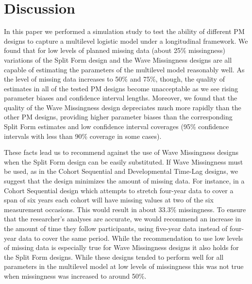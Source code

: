 \documentclass{svjour3}                     %
\begin{document}
\section{Discussion}
\label{4}
In this paper we performed a simulation study to test the ability of different PM designs to capture a multilevel logistic model under a longitudinal framework. We found that for low levels of planned missing data (about 25\% missingness) variations of the Split Form design and the Wave Missingness designs are all capable of estimating the parameters of the multilevel model reasonably well. As the level of missing data increases to 50\% and 75\%, though, the quality of estimates in all of the tested PM designs become unacceptable as we see rising parameter biases and confidence interval lengths. Moreover, we found that the quality of the Wave Missingness design depreciates much more rapidly than the other PM designs, providing higher parameter biases than the corresponding Split Form estimates and low confidence interval coverages (95\% confidence intervals with less than 90\% coverage in some cases). \par

These facts lead us to recommend against the use of Wave Missingness designs when the Split Form design can be easily substituted. If Wave Missingness must be used, as in the Cohort Sequential and Developmental Time-Lag designs, we suggest that the design minimizes the amount of missing data. For instance, in a Cohort Sequential design which attempts to stretch four-year data to cover a span of six years each cohort will have missing values at two of the six measurement occasions. This would result in about 33.3\% missingness. To ensure that the researcher's analyses are accurate, we would recommend an increase in the amount of time they follow participants, using five-year data instead of four-year data to cover the same period. While the recommendation to use low levels of missing data is especially true for Wave Missingness designs it also holds for the Split Form designs. While these designs tended to perform well for all parameters in the multilevel model at low levels of missingness this was not true when missingness was increased to around 50\%. \par
\end{document}
